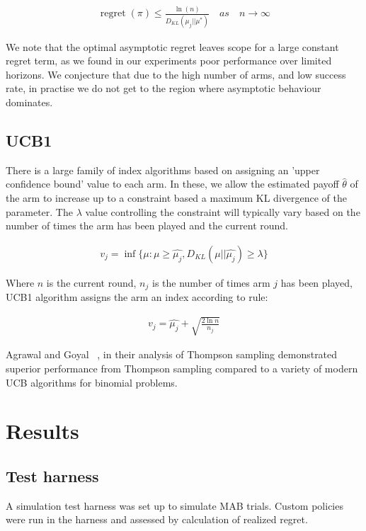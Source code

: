 \documentclass[11pt,a4,singlespacing,titlepagenumber=on]{scrreprt}
\numberwithin{equation}{chapter} %
\theoremstyle{remark}
\begin{document}
\begin{align}
\operatorname{regret}(\pi)  \leq  \frac{\ln(n)}{D_{KL}(\mu_j||\mu^{*})} \quad as \quad n \to \infty
\end{align}

We note that the optimal asymptotic regret leaves scope for a large constant regret term, as we found in our experiments poor performance over limited horizons. We conjecture that due to the high number of arms, and low success rate, in practise we do not get to the region where asymptotic behaviour dominates.

\section{ UCB1 }

There is a large family of index algorithms based on assigning an 'upper confidence bound' value to each arm. In these, we allow the estimated payoff $\hat{\theta}$ of the arm to increase up to a constraint based a maximum KL divergence of the parameter. The $\lambda$ value controlling the constraint will typically vary based on the number of times the arm has been played and the current round.

\begin{align}
v_j = \inf\{ \mu : \mu \geq \hat{\mu_j}, D_{KL}(\mu||\hat{\mu_j}) \geq \lambda\} 
\end{align}

Where $n$ is the current round, $n_j$ is the number of times arm $j$ has been played, UCB1 algorithm assigns the arm an index according to rule:

\begin{align}
v_j = \hat{\mu_j} + \sqrt{ \frac{2 \ln{n}}{n_j}  }
\end{align}

Agrawal and Goyal ~\cite{DBLP:journals/corr/abs-1111-1797}, in their analysis of Thompson sampling demonstrated superior performance from Thompson sampling compared to a variety of modern UCB algorithms for binomial problems.

\chapter{ Results }

\section{Test harness}

A simulation test harness was set up to simulate MAB trials. Custom policies were run in the harness and assessed by calculation of realized regret.
\end{document}
